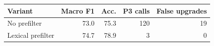 \begin{tabular}{lrrrr}
\toprule
\textbf{Variant} & \textbf{Macro F1} & \textbf{Acc.} & \textbf{P3 calls} & \textbf{False upgrades} \\
\midrule
No prefilter & 73.0 & 75.3 & 120 & 19 \\
Lexical prefilter & 74.7 & 78.9 & 3 & 0 \\
\bottomrule
\end{tabular}
